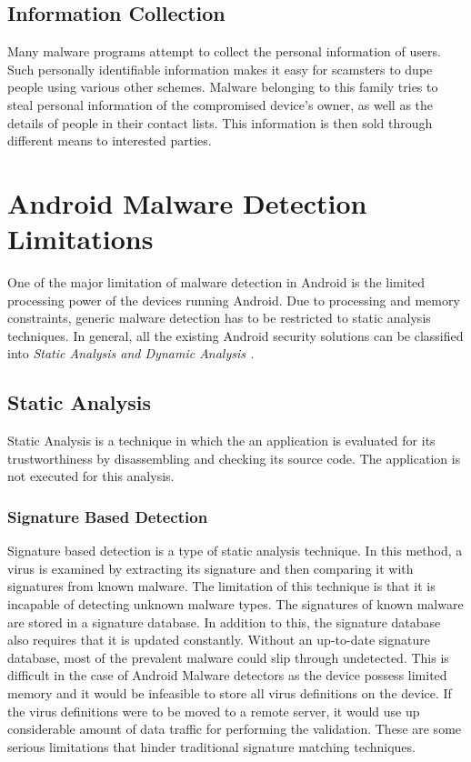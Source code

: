 \subsection{Information Collection}
Many malware programs attempt to collect the personal information of users. Such personally identifiable information makes it easy for scamsters to dupe people using various other schemes. Malware belonging to this family tries to steal personal information of the compromised device's owner, as well as the details of people in their contact lists. This information is then sold through different means to interested parties.

\section{Android Malware Detection Limitations}
One of the major limitation of malware detection in Android is the limited processing power of the devices running Android. Due to processing and memory constraints, generic malware detection has to be restricted to static analysis techniques. In general, all the existing Android security solutions can be classified into \em{Static Analysis} and \em{Dynamic Analysis} \cite{arshad}.

\subsection{Static Analysis}
Static Analysis is a technique in which the an application is evaluated for its trustworthiness by disassembling and checking its source code. The application is not executed for this analysis. 
\subsubsection{Signature Based Detection}
Signature based detection is a type of static analysis technique. In this method, a virus is examined by extracting its signature and then comparing it with signatures from known malware. The limitation of this technique is that it is incapable of detecting unknown malware types. The signatures of known malware are stored in a signature database. In addition to this, the signature database also requires that it is updated constantly. Without an up-to-date signature database, most of the prevalent malware could slip through undetected. This is difficult in the case of Android Malware detectors as the device possess limited memory and it would be infeasible to store all virus definitions on the device. If the virus definitions were to be moved to a remote server, it would use up considerable amount of data traffic for performing the validation. These are some serious limitations that hinder traditional signature matching techniques.
